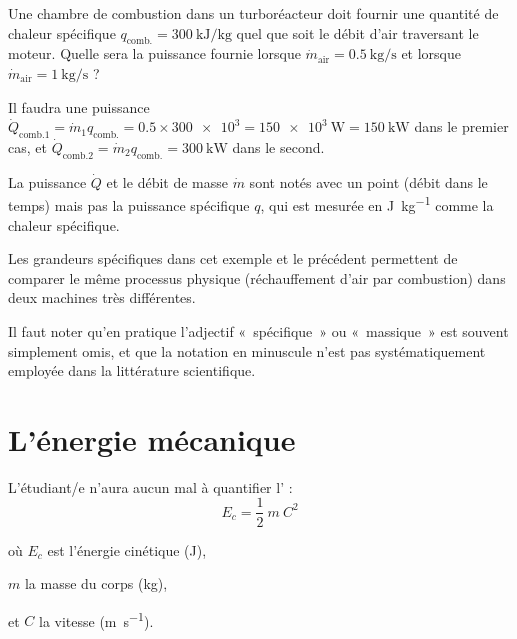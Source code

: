 \begin{description}
			\begin{anexample}
				Une chambre de combustion dans un turboréacteur doit fournir une quantité de chaleur spécifique $q_{\text{comb.}} = \SI{300}{\kilo\joule\per\kilogram}$ quel que soit le débit d’air traversant le moteur. Quelle sera la puissance fournie lorsque $\dot{m}_\text{air} = \SI{0,5}{\kilogram\per\second}$ et lorsque $\dot{m}_\text{air} = \SI{1}{\kilogram\per\second}$ ?
		
				\begin{answer}Il faudra une puissance $\dot{Q}_{\text{comb.}1} = \dot{m}_1 q_{\text{comb.}} = \num{0,5} \times \num{300e3} = \SI{150e3}{\watt} = \SI{150}{\kilo\watt}$ dans le premier cas, et $\dot{Q}_{\text{comb.}2} = \dot{m}_2 q_{\text{comb.}} = \SI{300}{\kilo\watt}$ dans le second.
					\begin{remark}La puissance $\dot{Q}$ et le débit de masse $\dot{m}$ sont notés avec un point (débit dans le temps) mais pas la puissance spécifique $q$, qui est mesurée en \si{\joule\per\kilogram} comme la chaleur spécifique.\end{remark}
					\begin{remark}Les grandeurs spécifiques dans cet exemple et le précédent permettent de comparer le même processus physique (réchauffement d’air par combustion) dans deux machines très différentes.\end{remark}
				\end{answer}
			\end{anexample}
		
		\end{description}

		Il faut noter qu’en pratique l’adjectif «~spécifique~» ou «~massique~» est souvent simplement omis, et que la notation en minuscule n’est pas systématiquement employée dans la littérature scientifique.

\onlyframabook{\clearpage}%
\section{L’énergie mécanique}
\label{ch_energie_mecanique}

	L’étudiant/e n’aura aucun mal à quantifier l’ :
	\begin{equation}
	E_{c} = \frac{1}{2} \ m \ C^2
	\label{eq_énergie_cinétique}
	\end{equation}
	\begin{equationterms}
		\item où \tab $E_{c}$ 	\tab est l’énergie cinétique (\si{\joule}),
		\item 	\tab $m$ 		\tab la masse du corps (\si{\kilogram}),
		\item et	\tab $C$			\tab la vitesse (\si{\metre\per\second}).
	\end{equationterms}


